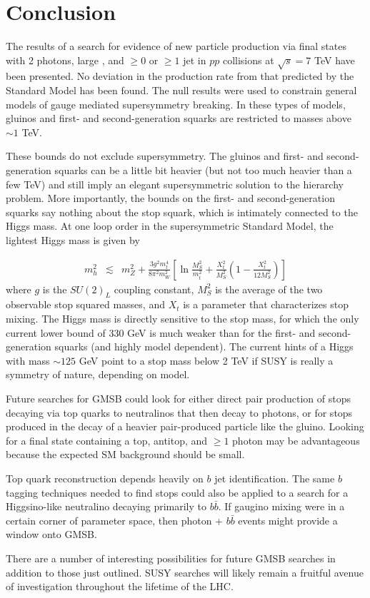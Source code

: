 \documentclass[dissertation.tex]{subfiles}
\begin{document}
\chapter{Conclusion}
\label{chap:Conclusion}

\thispagestyle{myheadings}
\markright{\hfill}

The results of a search for evidence of new particle production via final states with 2 photons, large \MET, and $\geq0$ or $\geq1$ jet in $pp$ collisions at $\sqrt{s} = 7$ TeV have been presented.  No deviation in the production rate from that predicted by the Standard Model has been found.  The null results were used to constrain general models of gauge mediated supersymmetry breaking.  In these types of models, gluinos and first- and second-generation squarks are restricted to masses above $\sim1$ TeV.

These bounds do not exclude supersymmetry.  The gluinos and first- and second-generation squarks can be a little bit heavier (but not too much heavier than a few TeV) and still imply an elegant supersymmetric solution to the hierarchy problem.  More importantly, the bounds on the first- and second-generation squarks say nothing about the stop squark, which is intimately connected to the Higgs mass.  At one loop order in the supersymmetric Standard Model, the lightest Higgs mass is given by \cite{Carena}

\begin{eqnarray}
m_{h}^{2} &\lesssim& m_{Z}^{2} + \frac{3g^{2}m_{t}^{4}}{8\pi^{2}m_{W}^{2}}\left[\ln\frac{M_{S}^{2}}{m_{t}^{2}} + \frac{X_{t}^{2}}{M_{S}^{2}}(1 - \frac{X_{t}^{2}}{12M_{S}^{2}})\right]
\end{eqnarray}
%
where $g$ is the $SU(2)_{L}$ coupling constant, $M_{S}^{2}$ is the average of the two observable stop squared masses, and $X_{t}$ is a parameter that characterizes stop mixing.  The Higgs mass is directly sensitive to the stop mass, for which the only current lower bound of 330 GeV \cite{ATLAS_GMSB_stop_search} is much weaker than for the first- and second-generation squarks (and highly model dependent).  The current hints of a Higgs with mass $\sim125$ GeV \cite{Chatrchyan201226, Aad201249} point to a stop mass below 2 TeV if SUSY is really a symmetry of nature, depending on model.

Future searches for GMSB could look for either direct pair production of stops decaying via top quarks to neutralinos that then decay to photons, or for stops produced in the decay of a heavier pair-produced particle like the gluino.  Looking for a final state containing a top, antitop, and $\geq1$ photon may be advantageous because the expected SM background should be small.

Top quark reconstruction depends heavily on $b$ jet identification.  The same $b$ tagging techniques needed to find stops could also be applied to a search for a Higgsino-like neutralino decaying primarily to $b\bar{b}$.  If gaugino mixing were in a certain corner of parameter space, then photon + $b\bar{b}$ events might provide a window onto GMSB.

There are a number of interesting possibilities for future GMSB searches in addition to those just outlined.  SUSY searches will likely remain a fruitful avenue of investigation throughout the lifetime of the LHC.
\end{document}
